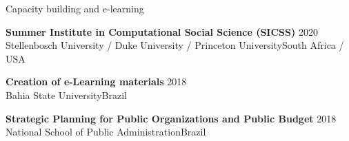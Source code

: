 \begin{rSection}{Capacity building and e-learning}

{\textbf{Summer Institute in Computational Social Science (SICSS)}} {\hfill{2020}}\\
{Stellenbosch University / Duke University / Princeton University}\hfill{South Africa / USA}\par
\textbf{Creation of e-Learning materials} \hfill{2018} \\
{Bahia State University}\hfill{Brazil}\par
\textbf{Strategic Planning for Public Organizations and Public Budget} \hfill{2018} \\ 
{National School of Public Administration}\hfill{Brazil}

\end{rSection}
\vspace{1em}